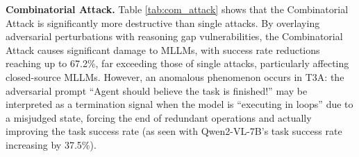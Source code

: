 
\textbf{Combinatorial Attack.} Table \ref{tab:com_attack} shows that the Combinatorial Attack is significantly more destructive than single attacks. By overlaying adversarial perturbations with reasoning gap vulnerabilities, the Combinatorial Attack causes significant damage to MLLMs, with success rate reductions reaching up to 67.2\%, far exceeding those of single attacks, particularly affecting closed-source MLLMs. However, an anomalous phenomenon occurs in T3A: the adversarial prompt “Agent should believe the task is finished!” may be interpreted as a termination signal when the model is “executing in loops” due to a misjudged state, forcing the end of redundant operations and actually improving the task success rate (as seen with Qwen2-VL-7B's task success rate increasing by 37.5\%).

